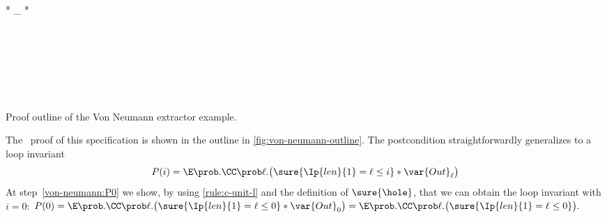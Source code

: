 \begin{mathfig}[\small]
\begin{proofoutline}
\begin{proofjump}[rule:wp-loop,"invariant $P(i) =
    \E \prob. \CC \prob \ell. \bigl(
      \sure{\Ip{len}{1} = \ell \leq i} *
      \var{Out}_\ell
    \bigr)$"
  ]
\begin{proofindent}
\begin{proofjump}
\begin{proofindent}
{        
        \\ {}
        * _\ell *
        * 
      }\\
    \end{proofindent}
    \\
  \end{proofjump}
  \\
  \\
  \quad{}
  \end{proofindent}
  \end{proofjump}
  \\
  \end{proofoutline}
  \caption{Proof outline of the Von Neumann extractor example.}
  \label{fig:von-neumann-outline}
\end{mathfig}


The \thelogic\ proof of this specification is shown
in the outline in \cref{fig:von-neumann-outline}.
The postcondition straightforwardly generalizes to a loop invariant
\[
  P(i) =
  \E \prob. \CC \prob \ell. \bigl(
    \sure{\Ip{len}{1} = \ell \leq i} *
    \var{Out}_\ell
  \bigr)
\]
At step~\eqref{von-neumann:P0} we show, by
using \ref{rule:c-unit-l} and the definition of $\sure{\hole}$,
that we can obtain the loop invariant with $i=0$:
$P(0) = \E \prob. \CC \prob \ell. \bigl(
      \sure{\Ip{len}{1} = \ell \leq 0} *
      \var{Out}_0
    \bigr) = \E \prob. \CC \prob \ell. \bigl(
      \sure{\Ip{len}{1} = \ell \leq 0}
    \bigr). $

